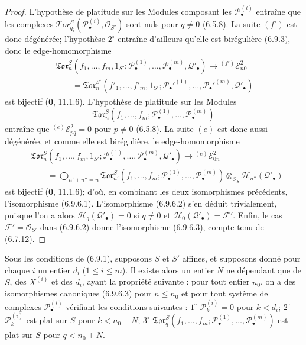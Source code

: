 \begin{proof}
L'hypothèse de platitude sur les Modules composant les
$\mathscr P_\bullet^{(i)}$ entraîne que les complexes
$\mathscr{T}\!or_{q_i}^S(\mathscr P_\bullet^{(i)},\mathscr O_{S'})$ sont nuls
pour $q\ne0$ (6.5.8). La suite $(f')$ est donc dégénérée; l'hypothèse
$2^\circ$ entraîne d'ailleurs qu'elle est birégulière (6.9.3), donc le
edge-homomorphisme
\[
\begin{split}
  &\mathfrak{Tor}_n^S
  (f_1,\ldots,f_m,1_{S'};
   \mathscr P_\bullet^{(1)},\ldots,
   \mathscr P_\bullet^{(m)},\mathscr Q'_\bullet)
  \longrightarrow {}^{(f')}\mathscr E_{n0}^2=\\
  &\qquad=
  \mathfrak{Tor}_n^{S'}
  (f'_1,\ldots,f'_m,1_{S'};
   \mathscr P_\bullet'^{(1)},\ldots,
   \mathscr P_\bullet'^{(m)},\mathscr Q'_\bullet)
\end{split}
\tag{6.9.6.4}\label{III.6.9.6.4.fr}
\]
est bijectif (\textbf{0}, 11.1.6). L'hypothèse de platitude sur les Modules
\[
  \mathfrak{Tor}_n^S
  (f_1,\ldots,f_m;
   \mathscr P_\bullet^{(1)},\ldots,\mathscr P_\bullet^{(m)})
\]
entraîne que ${}^{(e)}\mathscr E_{pq}^2=0$ pour $p\ne0$ (6.5.8). La suite
$(e)$ est donc aussi dégénérée, et comme elle est birégulière, le
edge-homomorphisme
\[
\begin{split}
  &\mathfrak{Tor}_n^S
  (f_1,\ldots,f_m,1_{S'};
   \mathscr P_\bullet^{(1)},\ldots,
   \mathscr P_\bullet^{(m)},\mathscr Q'_\bullet)
  \longrightarrow {}^{(e)}\mathscr E_{0n}^2=\\
  &\qquad=
  \bigoplus_{n'+n''=n}
  \mathfrak{Tor}_{n'}^S
  (f_1,\ldots,f_m;
   \mathscr P_\bullet^{(1)},\ldots,
   \mathscr P_\bullet^{(m)})
  \otimes_{\mathscr O_S}\mathscr H_{n''}(\mathscr Q'_\bullet)
\end{split}
\tag{6.9.6.5}\label{III.6.9.6.5.fr}
\]
est bijectif (\textbf{0}, 11.1.6); d'où, en combinant les deux isomorphismes
précédents, l'isomorphisme (6.9.6.1). L'isomorphisme (6.9.6.2) s'en déduit
trivialement, puisque l'on a alors
$\mathscr H_q(\mathscr Q'_\bullet)=0$ si $q\ne0$ et
$\mathscr H_0(\mathscr Q'_\bullet)=\mathscr F'$. Enfin, le cas
$\mathscr F'=\mathscr O_{S'}$ dans (6.9.6.2) donne l'isomorphisme (6.9.6.3),
compte tenu de (6.7.12).
\end{proof}

\begin{corollary}[6.9.7]
Sous les conditions de \textup{(6.9.1)}, supposons $S$ et $S'$ affines, et supposons
donné pour chaque $i$ un entier $d_i$ ($1\leq i\leq m$). Il existe alors un
entier $N$ ne dépendant que de $S$, des $X^{(i)}$ et des $d_i$, ayant la
propriété suivante : pour tout entier $n_0$, on a des isomorphismes canoniques
\textup{(6.9.6.3)} pour $n\leq n_0$ et pour tout système de complexes
$\mathscr P_\bullet^{(i)}$ vérifiant les conditions suivantes :
$1^\circ$ $\mathscr P_k^{(i)}=0$ pour $k<d_i$;
$2^\circ$ $\mathscr P_k^{(i)}$ est plat sur $S$ pour $k<n_0+N$;
$3^\circ$
$\mathfrak{Tor}_q^S(f_1,\ldots,f_m;
\mathscr P_\bullet^{(1)},\ldots,\mathscr P_\bullet^{(m)})$ est plat sur
$S$ pour $q<n_0+N$.
\end{corollary}

